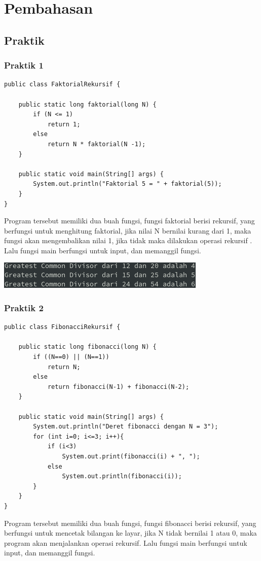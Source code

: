 \documentclass[a4paper,12pt]{article}
\begin{document}
\section{Pembahasan}
\subsection{Praktik}
\subsubsection{Praktik 1}
\begin{lstlisting}
public class FaktorialRekursif {

    public static long faktorial(long N) {
        if (N <= 1)
            return 1;
        else
            return N * faktorial(N -1);
    }

    public static void main(String[] args) {
        System.out.println("Faktorial 5 = " + faktorial(5));
    }
}
\end{lstlisting}

Program tersebut memiliki dua buah fungsi, fungsi faktorial berisi rekursif, yang berfungsi untuk menghitung faktorial,
jika nilai N bernilai kurang dari 1, maka fungsi akan mengembalikan nilai 1, jika tidak maka dilakukan operasi rekursif
. Lalu fungsi main berfungsi untuk input, dan memanggil fungsi.

\begin{center}
    \includegraphics[scale=1]{1.png} 
\end{center}

\subsubsection{Praktik 2}
\begin{lstlisting}
public class FibonacciRekursif {

    public static long fibonacci(long N) {
        if ((N==0) || (N==1))
            return N;
        else
            return fibonacci(N-1) + fibonacci(N-2);
    }

    public static void main(String[] args) {
        System.out.println("Deret fibonacci dengan N = 3");
        for (int i=0; i<=3; i++){
            if (i<3)
                System.out.print(fibonacci(i) + ", ");
            else
                System.out.println(fibonacci(i));
        }
    }
}
\end{lstlisting}
Program tersebut memiliki dua buah fungsi, fungsi fibonacci berisi rekursif, yang berfungsi untuk mencetak bilangan ke
layar, jika N tidak bernilai 1 atau 0, maka program akan menjalankan operasi rekursif. Lalu fungsi main berfungsi untuk input, dan memanggil fungsi.
\end{document}
